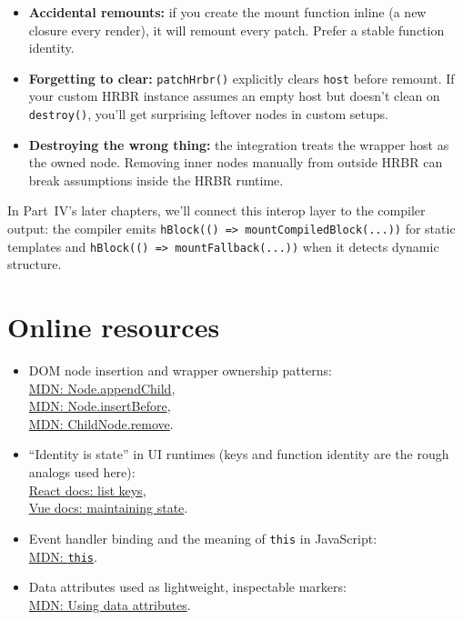 \begin{itemize}
\item \textbf{Accidental remounts:} if you create the mount function inline (a new closure every render), it will remount every patch. Prefer a stable function identity.
\item \textbf{Forgetting to clear:} \texttt{patchHrbr()} explicitly clears \texttt{host} before remount. If your custom HRBR instance assumes an empty host but doesn't clean on \texttt{destroy()}, you'll get surprising leftover nodes in custom setups.
\item \textbf{Destroying the wrong thing:} the integration treats the wrapper host as the owned node. Removing inner nodes manually from outside HRBR can break assumptions inside the HRBR runtime.
\end{itemize}

In Part~IV's later chapters, we'll connect this interop layer to the compiler output: the compiler emits \texttt{hBlock(() => mountCompiledBlock(...))} for static templates and \texttt{hBlock(() => mountFallback(...))} when it detects dynamic structure.

\section{Online resources}

\begin{itemize}
\item DOM node insertion and wrapper ownership patterns:\\
\href{https://developer.mozilla.org/en-US/docs/Web/API/Node/appendChild}{MDN: Node.appendChild},\\
\href{https://developer.mozilla.org/en-US/docs/Web/API/Node/insertBefore}{MDN: Node.insertBefore},\\
\href{https://developer.mozilla.org/en-US/docs/Web/API/ChildNode/remove}{MDN: ChildNode.remove}.

\item ``Identity is state'' in UI runtimes (keys and function identity are the rough analogs used here):\\
\href{https://react.dev/learn/rendering-lists#keeping-list-items-in-order-with-key}{React docs: list keys},\\
\href{https://vuejs.org/guide/essentials/list.html#maintaining-state}{Vue docs: maintaining state}.

\item Event handler binding and the meaning of \texttt{this} in JavaScript:\\
\href{https://developer.mozilla.org/en-US/docs/Web/JavaScript/Reference/Operators/this}{MDN: \texttt{this}}.

\item Data attributes used as lightweight, inspectable markers:\\
\href{https://developer.mozilla.org/en-US/docs/Learn/HTML/Howto/Use_data_attributes}{MDN: Using data attributes}.
\end{itemize}
